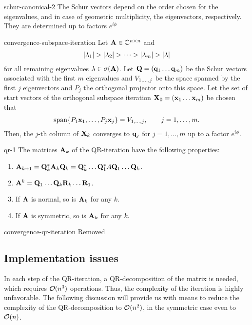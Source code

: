 \begin{Lemma}{schur-canonical-2}
  The Schur vectors depend on the order chosen for the eigenvalues,
  and in case of geometric multiplicity, the eigenvectors,
  respectively. They are determined up to factors $e^{i\phi}$
\end{Lemma}

\begin{Theorem}{convergence-subspace-iteration}
  Let $\mathbf A\in\mathbb C^{n\times n}$ and
  \begin{gather}
    \lvert\lambda_1\rvert >
    \lvert\lambda_2\rvert>\dots>\lvert\lambda_m\rvert>\lvert\lambda\rvert
  \end{gather}
  for all
  remaining eigenvalues $\lambda\in\sigma(\mathbf A)$. Let
  $\mathbf Q = (\mathbf q_1\dots\mathbf q_m)$ be the Schur vectors associated with the
  first $m$ eigenvalues and $V_{1,\dots,j}$ be the space spanned by
  the first $j$ eigenvectors and $P_j$ the orthogonal projector
  onto this space. Let the set of start vectors of the orthogonal subspace iteration
  $\mathbf X_0 = (\mathbf x_1\dots\mathbf x_m)$ be chosen that
  \begin{gather}
    \operatorname{span}\{P_1 \mathbf x_1,\dots,P_j\mathbf x_j\} = V_{1,\dots,j},\qquad j=1,\dots,m.
  \end{gather}
  Then, the $j$-th column of $\mathbf X_k$ converges to $\mathbf q_j$ for $j=1,\dots,m$ up to a factor $e^{i\phi}$.
\end{Theorem}

\begin{Lemma}{qr-1}
  The matrices $\mathbf A_k$ of the QR-iteration have the following properties:
  \begin{enumerate}
  \item $\mathbf A_{k+1} = \mathbf Q_k^*\mathbf A_k\mathbf Q_k = \mathbf Q_k^*\dots\mathbf Q_1^*A\mathbf Q_1\dots\mathbf Q_k$.
  \item $\mathbf A^k=\mathbf Q_1\dots\mathbf Q_k\mathbf R_k\dots\mathbf R_1$.
  \item If $\mathbf A$ is normal, so is $\mathbf A_k$ for any $k$.
  \item If $\mathbf A$ is symmetric, so is $\mathbf A_k$ for any $k$.
  \end{enumerate}
\end{Lemma}

\begin{Theorem}{convergence-qr-iteration}
Removed
\end{Theorem}

\subsection{Implementation issues}
\begin{intro}
  In each step of the QR-iteration, a QR-decomposition of the matrix
  is needed, which requires $\mathcal O(n^3)$ operations. Thus, the
  complexity of the iteration is highly unfavorable. The following
  discussion will provide us with means to reduce the complexity of
  the QR-decomposition to $\mathcal O(n^2)$, in the symmetric case even to
  $\mathcal O(n)$.
\end{intro}

